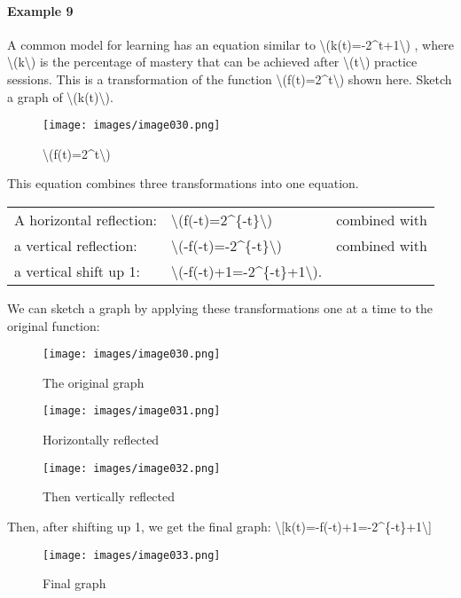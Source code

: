 \hypertarget{example-9}{%
\paragraph{Example 9}\label{example-9}}

A common model for learning has an equation similar to
\textbackslash{}(k(t)=-2\^{}t+1\textbackslash{}) , where
\textbackslash{}(k\textbackslash{}) is the percentage of mastery that
can be achieved after \textbackslash{}(t\textbackslash{}) practice
sessions. This is a transformation of the function
\textbackslash{}(f(t)=2\^{}t\textbackslash{}) shown here. Sketch a graph
of \textbackslash{}(k(t)\textbackslash{}).

\begin{figure}
\centering
\texttt{[image: images/image030.png]}
\caption{\textbackslash{}(f(t)=2\^{}t\textbackslash{})}
\end{figure}

This equation combines three transformations into one equation.

\begin{longtable}[]{@{}lll@{}}
\toprule
\endhead
A horizontal reflection: &
\textbackslash{}(f(-t)=2\^{}\{-t\}\textbackslash{}) & combined
with\tabularnewline
a vertical reflection: &
\textbackslash{}(-f(-t)=-2\^{}\{-t\}\textbackslash{}) & combined
with\tabularnewline
a vertical shift up 1: &
\textbackslash{}(-f(-t)+1=-2\^{}\{-t\}+1\textbackslash{}).
&\tabularnewline
\bottomrule
\end{longtable}

We can sketch a graph by applying these transformations one at a time to
the original function:

\begin{figure}
\centering
\texttt{[image: images/image030.png]}
\caption{The original graph}
\end{figure}

\begin{figure}
\centering
\texttt{[image: images/image031.png]}
\caption{Horizontally reflected}
\end{figure}

\begin{figure}
\centering
\texttt{[image: images/image032.png]}
\caption{Then vertically reflected}
\end{figure}

Then, after shifting up 1, we get the final graph:
\textbackslash{}{[}k(t)=-f(-t)+1=-2\^{}\{-t\}+1\textbackslash{}{]}

\begin{figure}
\centering
\texttt{[image: images/image033.png]}
\caption{Final graph}
\end{figure}

